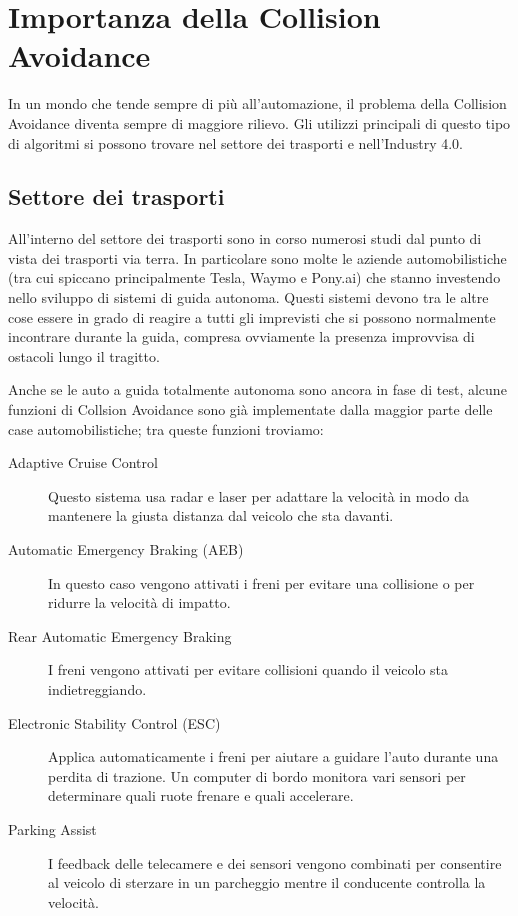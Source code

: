 \documentclass[Lau, binding=0.6cm, oneside]{sapthesis}
\begin{document}
\section{Importanza della Collision Avoidance}
In un mondo che tende sempre di più all'automazione, il problema della Collision Avoidance diventa sempre di maggiore rilievo.
Gli utilizzi principali di questo tipo di algoritmi si possono trovare nel settore dei trasporti e nell'Industry 4.0.

\subsection{Settore dei trasporti}
All'interno del settore dei trasporti sono in corso numerosi studi dal punto di vista dei trasporti via terra.
In particolare sono molte le aziende automobilistiche (tra cui spiccano principalmente Tesla, Waymo e Pony.ai) che stanno investendo nello sviluppo di sistemi di guida autonoma.
Questi sistemi devono tra le altre cose essere in grado di reagire a tutti gli imprevisti che si possono normalmente incontrare durante la guida, compresa ovviamente la presenza improvvisa di ostacoli lungo il tragitto.

Anche se le auto a guida totalmente autonoma sono ancora in fase di test, alcune funzioni di Collsion Avoidance sono già implementate dalla maggior parte delle case automobilistiche; tra queste funzioni troviamo\cite{fonte8}:
\begin{description}
	\item[Adaptive Cruise Control] Questo sistema usa radar e laser per adattare la velocità in modo da mantenere la giusta distanza dal veicolo che sta davanti.
	\item[Automatic Emergency Braking (AEB)] In questo caso vengono attivati i freni per evitare una collisione o per ridurre la velocità di impatto.
	\item[Rear Automatic Emergency Braking] I freni vengono attivati per evitare collisioni quando il veicolo sta indietreggiando.
	\item[Electronic Stability Control (ESC)] Applica automaticamente i freni per aiutare a guidare l'auto durante una perdita di trazione. Un computer di bordo monitora vari sensori per determinare quali ruote frenare e quali accelerare.
	\item[Parking Assist] I feedback delle telecamere e dei sensori vengono combinati per consentire al veicolo di sterzare in un parcheggio mentre il conducente controlla la velocità.
\end{description} 
\end{document}
